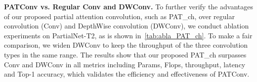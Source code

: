 \begin{table}[ht] \small
  \centering
  \caption{The results of applying PATConv to other models.}
  \label{tab:abla_block_acc_other}
\end{table}

\textbf{PATConv vs. Regular Conv and DWConv.}
To further verify the advantages of our proposed partial attention convolution, such as PAT\_ch, over regular convolution (Conv) and DepthWise convolution (DWConv), we conduct ablation experiments on PartialNet-T2, as is shown in~\cref{tab:abla_PAT_ch}. To make a fair comparison, we widen DWConv to keep the throughput of the three convolution types in the same range. The results show that our proposed PAT\_ch surpasses Conv and DWConv in all metrics including Params, Flops, throughput, latency and Top-1 accuracy, which validates the efficiency and effectiveness of PATConv. 

\begin{table}[ht] \small
  \centering
  \caption{Ablation on PartialNet-T2 with different convolution types on ImageNet-1K dataset.}
  \label{tab:abla_PAT_ch}
\end{table}

